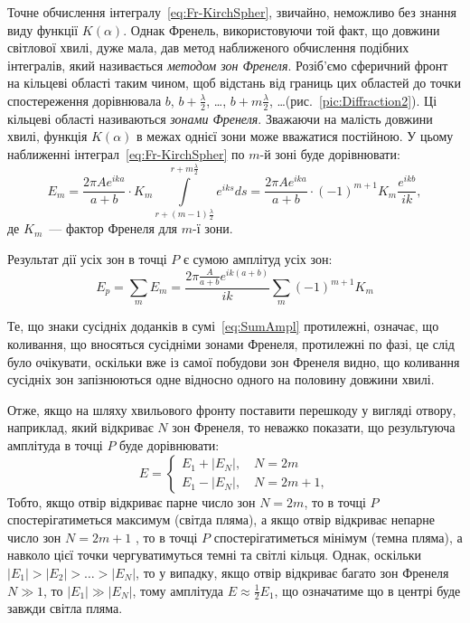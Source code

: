 Точне обчислення інтегралу~\eqref{eq:Fr-KirchSpher}, звичайно, неможливо без знання виду функції $K(\alpha)$. Однак Френель, використовуючи той факт, що довжини світлової хвилі, дуже мала, дав метод наближеного обчислення подібних інтегралів, який називається \emph{методом зон Френеля}. Розіб'ємо сферичний фронт на кільцеві області таким чином, щоб відстань від границь цих областей до точки спостереження дорівнювала $b$, $b + \frac\lambda2$, \ldots,  $b + m\frac\lambda2$, \ldots  (рис.~\ref{pic:Diffraction2}). Ці кільцеві області називаються \emph{зонами Френеля}. Зважаючи на малість довжини хвилі, функція $K(\alpha)$ в межах однієї зони може вважатися постійною. У цьому наближенні інтеграл~\eqref{eq:Fr-KirchSpher} по $m$-й зоні буде дорівнювати:
\begin{equation}\label{eq:Fr-KirchSpher_m}
    E_m = \frac{2\pi Ae^{ika}}{a + b} \cdot K_m\int\limits_{r + (m-1)\frac\lambda2}^{r + m\frac\lambda2}   e^{iks} ds = \frac{2\pi Ae^{ika}}{a + b} \cdot (-1)^{m+1}K_m \frac{e^{ikb}}{ik},
\end{equation}
де $K_m$~--- фактор Френеля для $m$-ї зони.

Результат дії усіх зон в точці $P$ є сумою амплітуд усіх зон:
\begin{equation}\label{eq:SumAmpl}
    E_p = \sum\limits_{m} E_m =\frac{2\pi \frac{A}{a+b}e^{ik(a + b)}}{ik}  \sum\limits_{m} (-1)^{m+1}K_m
\end{equation}

Те, що знаки сусідніх  доданків в сумі~\eqref{eq:SumAmpl} протилежні, означає, що коливання, що вносяться сусідніми зонами Френеля, протилежні по фазі, це слід було очікувати, оскільки вже із самої побудови зон Френеля видно, що  коливання  сусідніх зон запізнюються одне відносно одного на половину довжини хвилі.

Отже, якщо на шляху хвильового фронту поставити перешкоду у вигляді отвору, наприклад, який відкриває $N$ зон Френеля, то неважко показати, що результуюча амплітуда в точці $P$ буде дорівнювати:
\begin{equation}
    E = 
    \begin{cases}
        E_1 + |E_N|, \quad N = 2m \\
        E_1 - |E_N|, \quad N = 2m+1,
    \end{cases}
\end{equation}
Тобто, якщо отвір відкриває парне число зон $N = 2m$, то в точці $P$ спостерігатиметься максимум (світда пляма), а якщо отвір відкриває непарне число зон  $N = 2m + 1$ , то в точці $P$ спостерігатиметься мінімум (темна пляма), а навколо цієї точки чергуватимуться темні та світлі кільця. Однак, оскільки $|E_1|>|E_2|> \ldots >|E_N|$, то у випадку, якщо отвір відкриває багато зон Френеля $N \gg 1$, то $|E_1| \gg |E_N| $, тому амплітуда $E \approx \frac12 E_1$, що означатиме що в центрі буде завжди світла пляма.

